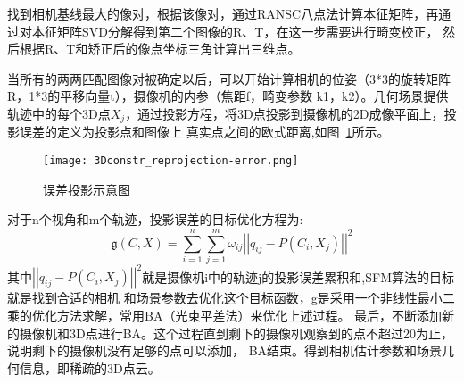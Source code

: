 找到相机基线最大的像对，根据该像对，通过RANSC八点法计算本征矩阵，再通过对本征矩阵SVD分解得到第二个图像的R、T，在这一步需要进行畸变校正，
然后根据R、T和矫正后的像点坐标三角计算出三维点。

当所有的两两匹配图像对被确定以后，可以开始计算相机的位姿（3*3的旋转矩阵R，1*3的平移向量t），摄像机的内参（焦距f，畸变参数
k1，k2）。几何场景提供轨迹中的每个3D点$X_j$，通过投影方程，将3D点投影到摄像机的2D成像平面上，投影误差的定义为投影点和图像上
真实点之间的欧式距离,如图~\ref{fig:3Dconstr_reprojection-error}所示。
\begin{figure}[H] %
  \centering
  \texttt{[image: 3Dconstr\_reprojection-error.png]}
  \caption{误差投影示意图}
  \label{fig:3Dconstr_reprojection-error}
\end{figure}
对于n个视角和m个轨迹，投影误差的目标优化方程为:
\begin{equation}
  \mathfrak g(C,X)=\sum_{i=1}^n\sum_{j=1}^m\omega_{ij}\left|\left|q_{ij}-P(C_i,X_j)\right|\right|^2
\end{equation}
其中$\left|\left|q_{ij}-P(C_i,X_j)\right|\right|^2$就是摄像机i中的轨迹j的投影误差累积和,SFM算法的目标就是找到合适的相机
和场景参数去优化这个目标函数，g是采用一个非线性最小二乘的优化方法求解，常用BA（光束平差法）来优化上述过程。
最后，不断添加新的摄像机和3D点进行BA。这个过程直到剩下的摄像机观察到的点不超过20为止，说明剩下的摄像机没有足够的点可以添加，
BA结束。得到相机估计参数和场景几何信息，即稀疏的3D点云。
